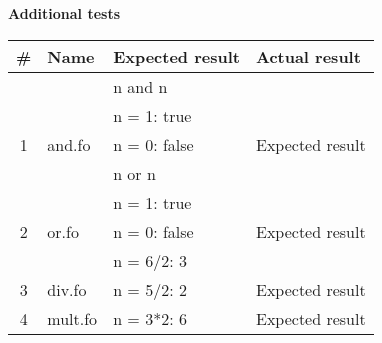 \documentclass[12pt]{article}
\begin{document}
\textbf{Additional tests}
\begin{table}[ht]
\centering
\label{my-label2}
\begin{tabular}{|c|l|l|l|}
\hline
# & \textbf{Name}  & \textbf{Expected result}  & \textbf{Actual result} \\ \hline
  &  & n and n & \\
  &  & n = 1: true & \\
1 & and.fo  & n = 0: false & Expected result \\ \hline
  &  &  n or n & \\
  &  & n = 1: true & \\
2 & or.fo  & n = 0: false & Expected result \\ \hline
  &         & n = 6/2: 3 & \\
3 & div.fo  & n = 5/2: 2 & Expected result \\ \hline
4 & mult.fo & n = 3*2: 6 & Expected result \\ \hline
\end{tabular}
\end{table}
\end{document}
